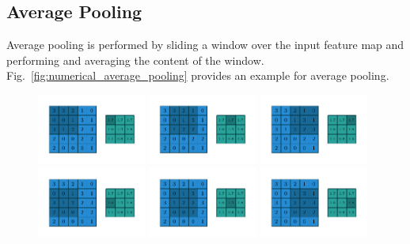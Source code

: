 \subsection{Average Pooling}
Average pooling is performed by sliding a window over the input feature map and performing and averaging the content of the window. Fig.~\ref{fig:numerical_average_pooling}
provides an example for average pooling.
\begin{figure}
    \centering
    \includegraphics[width=0.32\textwidth]{pdf/numerical_average_pooling_00.pdf}
    \includegraphics[width=0.32\textwidth]{pdf/numerical_average_pooling_01.pdf}
    \includegraphics[width=0.32\textwidth]{pdf/numerical_average_pooling_02.pdf}
    \includegraphics[width=0.32\textwidth]{pdf/numerical_average_pooling_03.pdf}
    \includegraphics[width=0.32\textwidth]{pdf/numerical_average_pooling_04.pdf}
    \includegraphics[width=0.32\textwidth]{pdf/numerical_average_pooling_05.pdf}

\end{figure}
